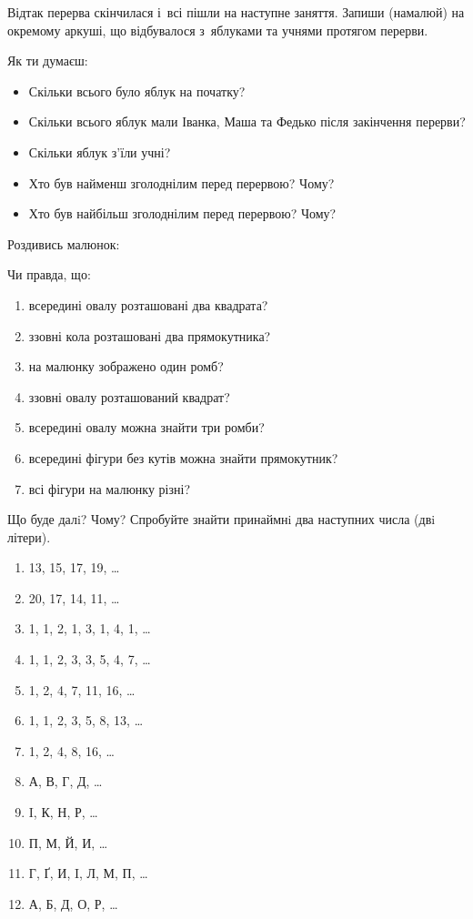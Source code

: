 Відтак перерва скінчилася і~всі пішли на наступне заняття.
Запиши (намалюй) на окремому аркуші, що відбувалося з~яблуками
та учнями протягом перерви.

Як ти думаєш:
\begin{itemize}
    \item Скільки всього було яблук на початку?
    \item Скільки всього яблук мали Іванка, Маша та Федько
    після закінчення перерви?
    \item Скільки яблук з'їли учні?
    \item Хто був найменш зголоднілим перед перервою? Чому?
    \item Хто був найбільш зголоднілим перед перервою? Чому?
\end{itemize}


\problem
Роздивись малюнок:

Чи правда, що:
\begin{enumerate}
    \item всередині овалу розташовані два квадрата?
    \item ззовні кола розташовані два прямокутника?
    \item на малюнку зображено один ромб?
    \item ззовні овалу розташований квадрат?
    \item всередині овалу можна знайти три ромби?
    \item всередині фігури без кутів можна знайти прямокутник?
    \item всі фігури на малюнку різні?
\end{enumerate}



\problem
Що буде далi? Чому?
Спробуйте знайти принаймнi два наступних числа (двi літери). 
\begin{enumerate}
    \item 13, 15, 17, 19, \ldots
    \item 20, 17, 14, 11, \ldots
    \item 1, 1, 2, 1, 3, 1, 4, 1, \ldots
    \item 1, 1, 2, 3, 3, 5, 4, 7, \ldots
    \item 1, 2, 4, 7, 11, 16, \ldots
    \item 1, 1, 2, 3, 5, 8, 13, \ldots
    \item 1, 2, 4, 8, 16, \ldots
    \item А, В, Г, Д, \ldots
    \item I, К, Н, Р, \ldots
    \item П, М, Й, И, \ldots
    \item Г, Ґ, И, I, Л, М, П, \ldots
    \item А, Б, Д, О, Р, \ldots
\end{enumerate}


